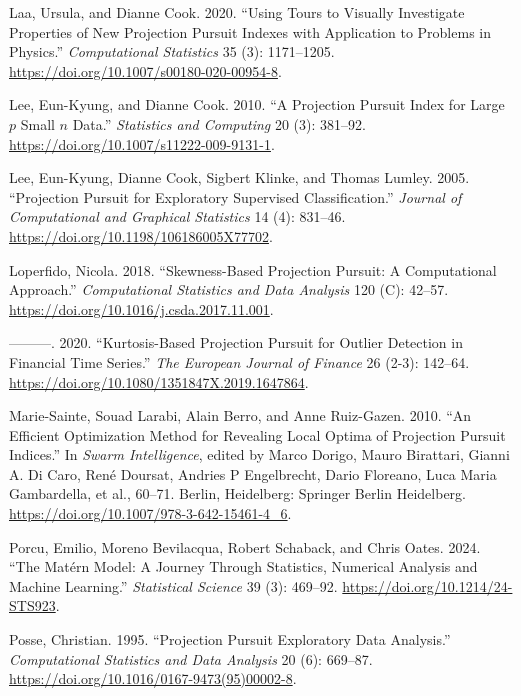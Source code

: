 \documentclass[
  12pt,
]{interact}
\newlength{\cslhangindent}
\newenvironment{CSLReferences}[2] %
 {\begin{list}{}{%
  \setlength{\itemindent}{0pt}
  \setlength{\leftmargin}{0pt}
  \setlength{\parsep}{0pt}
  \ifodd #1
   \setlength{\leftmargin}{\cslhangindent}
   \setlength{\itemindent}{-1\cslhangindent}
  \fi
  \setlength{\itemsep}{#2\baselineskip}}}
 {\end{list}}
\theoremstyle{plain}
\begin{document}
\begin{CSLReferences}{1}{0}
Laa, Ursula, and Dianne Cook. 2020. {``Using Tours to Visually
Investigate Properties of New Projection Pursuit Indexes with
Application to Problems in Physics.''} \emph{Computational Statistics}
35 (3): 1171--1205. \url{https://doi.org/10.1007/s00180-020-00954-8}.

Lee, Eun-Kyung, and Dianne Cook. 2010. {``A Projection Pursuit Index for
Large {\(p\)} Small {\(n\)} Data.''} \emph{Statistics and Computing} 20
(3): 381--92. \url{https://doi.org/10.1007/s11222-009-9131-1}.

Lee, Eun-Kyung, Dianne Cook, Sigbert Klinke, and Thomas Lumley. 2005.
{``Projection Pursuit for Exploratory Supervised Classification.''}
\emph{Journal of Computational and Graphical Statistics} 14 (4):
831--46. \url{https://doi.org/10.1198/106186005X77702}.

Loperfido, Nicola. 2018. {``Skewness-Based Projection Pursuit: A
Computational Approach.''} \emph{Computational Statistics and Data
Analysis} 120 (C): 42--57.
\url{https://doi.org/10.1016/j.csda.2017.11.001}.

---------. 2020. {``Kurtosis-Based Projection Pursuit for Outlier
Detection in Financial Time Series.''} \emph{The European Journal of
Finance} 26 (2-3): 142--64.
\url{https://doi.org/10.1080/1351847X.2019.1647864}.

Marie-Sainte, Souad Larabi, Alain Berro, and Anne Ruiz-Gazen. 2010.
{``An Efficient Optimization Method for Revealing Local Optima of
Projection Pursuit Indices.''} In \emph{Swarm Intelligence}, edited by
Marco Dorigo, Mauro Birattari, Gianni A. Di Caro, René Doursat, Andries
P Engelbrecht, Dario Floreano, Luca Maria Gambardella, et al., 60--71.
Berlin, Heidelberg: Springer Berlin Heidelberg.
\url{https://doi.org/10.1007/978-3-642-15461-4_6}.

Porcu, Emilio, Moreno Bevilacqua, Robert Schaback, and Chris Oates.
2024. {``The {M}atérn Model: A Journey Through Statistics, Numerical
Analysis and Machine Learning.''} \emph{Statistical Science} 39 (3):
469--92. \url{https://doi.org/10.1214/24-STS923}.

Posse, Christian. 1995. {``Projection Pursuit Exploratory Data
Analysis.''} \emph{Computational Statistics and Data Analysis} 20 (6):
669--87. \url{https://doi.org/10.1016/0167-9473(95)00002-8}.


\end{CSLReferences}
\end{document}
